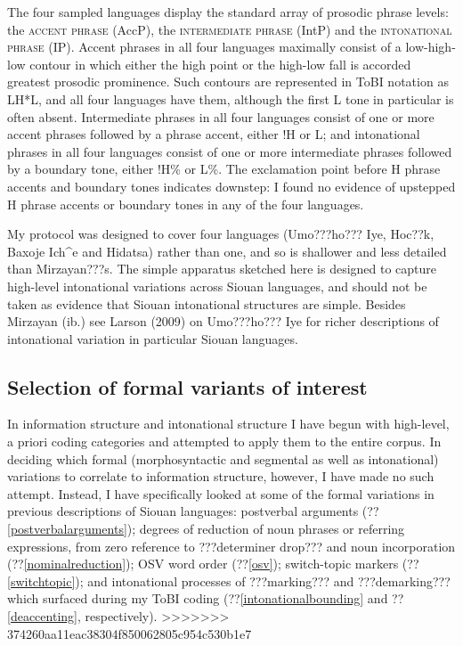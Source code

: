 \documentclass[output=paper]{LSP/langsci}
\begin{document}
The four sampled languages display the standard array of prosodic phrase levels: the \textsc{accent phrase} (AccP), the \textsc{intermediate phrase} (IntP) and the \textsc{intonational phrase} (IP). Accent phrases in all four languages maximally consist of a low-high-low contour in which either the high point or the high-low fall is accorded greatest prosodic prominence. Such contours are represented in ToBI notation as LH*L, and all four languages have them, although the first L tone in particular is often absent. Intermediate phrases in all four languages consist of one or more accent phrases followed by a phrase accent, either !H or L; and intonational phrases in all four languages consist of one or more intermediate phrases followed by a boundary tone, either !H\% or L\%. The exclamation point before H phrase accents and boundary tones indicates downstep: I found no evidence of upstepped H phrase accents or boundary tones in any of the four languages. 

My protocol was designed to cover four languages (Umo???ho??? Iye, Hoc??k, Baxoje Ich\^{}e and Hidatsa) rather than one, and so is shallower and less detailed than Mirzayan???s. The simple apparatus sketched here is designed to capture high-level intonational variations across Siouan languages, and should not be taken as evidence that Siouan intonational structures are simple. Besides Mirzayan (ib.) see Larson (2009) on Umo???ho??? Iye for richer descriptions of intonational variation in particular Siouan languages. 

\subsection{Selection of formal variants of interest}\label{variantselection}

In information structure and intonational structure I have begun with high-level, a priori coding categories and attempted to apply them to the entire corpus. In deciding which formal (morphosyntactic and segmental as well as intonational) variations to correlate to information structure, however, I have made no such attempt. Instead, I have specifically looked at some of the formal variations in previous descriptions of Siouan languages: postverbal arguments (??\ref{postverbalarguments}); degrees of reduction of noun phrases or referring expressions, from zero reference to ???determiner drop??? and noun incorporation (??\ref{nominalreduction}); OSV word order (??\ref{osv}); switch-topic markers (??\ref{switchtopic}); and intonational processes of ???marking??? and ???demarking??? which surfaced during my ToBI coding (??\ref{intonationalbounding} and ??\ref{deaccenting}, respectively).
>>>>>>> 374260aa11eac38304f850062805c954c530b1e7
\end{document}
